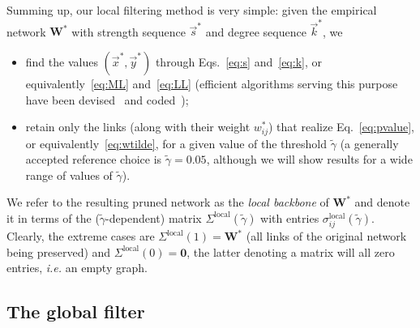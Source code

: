 \documentclass[aps,twocolumn,superscriptaddress]{revtex4-1}
\newcommand{\ie}{\emph{i.e.} }
\begin{document}
Summing up, our local filtering method is very simple: given the empirical network ${\bm W}^\ast$ with strength sequence $\vec{s}^\ast$ and degree sequence $\vec{k}^\ast$, we 
\begin{itemize}
\item find the values $(\vec{x}^\ast,\vec{y}^\ast)$ through Eqs.~\eqref{eq:s} and~\eqref{eq:k}, or equivalently~\eqref{eq:ML} and~\eqref{eq:LL} (efficient algorithms serving this purpose have been devised~\cite{squartini-njp-2015} and coded~\cite{mathworks,eli}); 
\item retain only the links (along with their weight $w^\ast_{ij}$) that realize Eq.~\eqref{eq:pvalue}, or equivalently~\eqref{eq:wtilde}, for a given value of the threshold $\widetilde{\gamma}$
(a generally accepted reference choice is $\widetilde{\gamma}=0.05$, although we will show results for a wide range of values of $\widetilde{\gamma}$).
\end{itemize}
We refer to the resulting pruned network as the \emph{local backbone} of ${\bm W}^\ast$ and denote it in terms of the ($\widetilde{\gamma}$-dependent) matrix
${\bm \varSigma}^\textrm{local}(\widetilde{\gamma})$ with entries $\sigma_{ij}^\textrm{local}(\widetilde{\gamma})$.
Clearly, the extreme cases are ${\bm \varSigma}^\textrm{local}(1)={\bm W}^\ast$ (all links of the original network being preserved) and ${\bm \varSigma}^\textrm{local}(0)={\bm 0}$, the latter denoting a matrix will all zero entries, \ie an empty graph.

\subsection{The global filter\label{sec:fglobal}}
\end{document}

